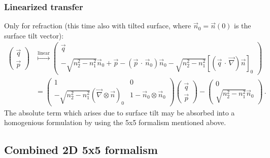 \documentclass[12pt,a4paper,twoside,openright,BCOR10mm,headsepline,titlepage,abstracton,chapterprefix,final]{scrreprt}
\newcommand{\scpm}[2]{(#1\,\cdot\,#2)}
\begin{document}
\subsubsection{Linearized transfer}
Only for refraction (this time also with tilted surface, where $\vec{n}_0 = \vec{n}(0)$ is the surface tilt vector):
\begin{align}
 \begin{pmatrix}
  \vec{q} \\
  \vec{p}
 \end{pmatrix} &\stackrel{\text{linear}}{\mapsto}
 \begin{pmatrix}
  \vec{q} \\
  -\sqrt{n_2^2 - n_1^2} \vec{n}_0 + \vec{p} - \scpm{\vec{p}}{\vec{n}_0} \vec{n}_0 - \sqrt{n_2^2 - n_1^2} [\scpm{\vec{q}}{\vec{\nabla}} \vec{n}]_0
 \end{pmatrix}\nonumber\\&=
 \begin{pmatrix}
  1 & 0\\
  -\sqrt{n_2^2-n_1^2} (\vec{\nabla} \otimes \vec{n})_0 & 1 - \vec{n}_0 \otimes \vec{n}_0
 \end{pmatrix}
 \begin{pmatrix}
  \vec{q} \\
  \vec{p}
 \end{pmatrix} -
 \begin{pmatrix}
  0 \\
  \sqrt{n_2^2-n_1^2} \vec{n}_0
 \end{pmatrix}
\,.
\end{align}
The absolute term which arises due to surface tilt may be absorbed into a homogenious formulation by using the 5x5 formalism mentioned above.

\subsection{Combined 2D 5x5 formalism}
\end{document}
